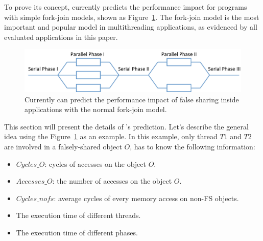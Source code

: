 
\label{sec:predictimprove}


To prove its concept, \cheetah{} currently predicts the performance impact for programs with simple fork-join models, shown as Figure~\ref{fig:forkjoinmodel}. 
The fork-join model is the most important and popular model in multithreading applications, as evidenced by all evaluated applications in this paper. 

\begin{figure}[ht!]
\begin{center}
\includegraphics[width=6.5in]{figure/forkjoin}
\end{center}
\caption{Currently \Cheetah{} can predict the performance impact of false sharing inside applications with the normal fork-join model.
\label{fig:forkjoinmodel}}
\end{figure}



This section will present the details of \cheetah{}'s prediction. Let's describe the general idea using the Figure~\ref{fig:forkjoinmodel} as an example. In this example, only thread $T1$ and $T2$ are involved in a falsely-shared object $O$, \cheetah{} has to know the following information:

\begin{itemize}
\item $Cycles\_O$: cycles of accesses on the object $O$.
\item $Accesses\_O$: the number of accesses on the object $O$.  
\item $Cycles\_{nofs}$: average cycles of every memory access on non-FS objects. 
\item The execution time of different threads.  
\item The execution time of different phases. 
\end{itemize}

